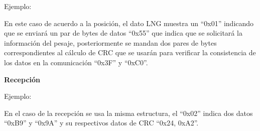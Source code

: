 \documentclass[12pt,a4paper]{article}
\begin{document}
                Ejemplo:
                
                \begin{center}
                \end{center}
                
                En este caso de acuerdo a la posición, el dato LNG muestra un ``0x01'' indicando que se enviará un par de bytes de datos ``0x55'' que indica que se solicitará la información del pesaje, posteriormente se mandan dos pares de bytes correspondientes al cálculo de CRC que se usarán para verificar la consistencia de los datos en la comunicación ``0x3F'' y ``0xC0''.
        
            \textbf{\normalsize{Recepción}}
                \begin{center}
                \end{center}
            
                Ejemplo:
            
                \begin{center}
                \end{center}
        
                En el caso de la recepción se usa la misma estructura, el ``0x02'' indica dos datos ``0xB9'' y ``0x9A'' y su respectivos datos de CRC ``0x24, 0xA2''.
        
\end{document}
